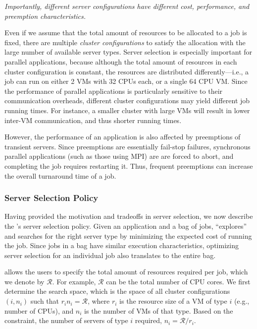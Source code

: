 \noindent \emph{Importantly, different server configurations have different cost, performance, and preemption characteristics. }


Even if we assume that the total amount of resources to be allocated to a job is fixed, there are multiple \emph{cluster configurations} to satisfy the allocation with the large number of available server types. 
Server selection is especially important for parallel applications, because although the total amount of resources in each cluster configuration is constant, the resources are distributed differently---i.e., a job can run on either 2 VMs with 32 CPUs each, or a single 64 CPU VM.  
Since the performance of parallel applications is particularly sensitive to their communication overheads, different cluster configurations may yield different job running times.
For instance, a smaller cluster with large VMs will result in lower inter-VM communication, and thus shorter running times. 

However, the performance of an application is also affected by preemptions of transient servers.
Since preemptions are essentially fail-stop failures, synchronous parallel applications (such as those using MPI) are 
are forced to  abort, and completing the job requires restarting it. 
Thus, frequent preemptions can increase the overall turnaround time of a job. 

\vspace*{\subsecspace}
\subsubsection{Server Selection Policy}

Having provided the motivation and tradeoffs in server selection, we now describe the \sysname's server selection policy. 
Given an application and a bag of jobs, \sysname ``explores'' and searches for the right server type by minimizing the expected cost of running the job.
Since jobs in a bag have similar execution characteristics, optimizing server selection for an individual job also translates to the entire bag. 


\sysname allows the users to specify the total amount of resources required per job, which we denote by $\mathcal{R}$.
For example, $\mathcal{R}$ can be the total number of CPU cores. 
We first determine the search space, which is the space of all cluster configurations $(i,n_i)$ such that $r_i n_i = \mathcal{R}$, where $r_i$ is the resource size of a VM of type $i$ (e.g., number of CPUs), and $n_i$ is the number of VMs of that type. 
Based on the constraint, the number of servers of type $i$ required, $n_i = \mathcal{R}/r_i$.

